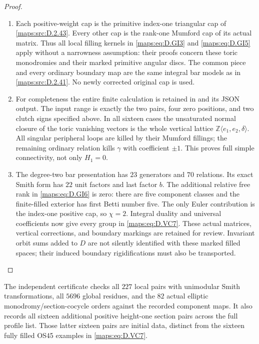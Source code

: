 \begin{proof}
\begin{enumerate}[label=\arabic*.,leftmargin=*]
\item Each positive-weight cap is the primitive index-one triangular cap
of \ref{maps:src:D.2.43}. Every other cap is the rank-one Mumford cap of its actual
matrix. Thus all local filling kernels in \eqref{maps:eq:D.GI3} and \eqref{maps:eq:D.GI5} apply
without a narrowness assumption: their proofs concern these toric
monodromies and their marked primitive angular discs. The common
piece and every ordinary boundary map are the same integral bar
models as in \ref{maps:src:D.2.41}. No newly corrected original cap is used.

\item For completeness the entire finite calculation is retained in
 and its JSON output.
The input range is exactly the two pairs, four zero positions,
and two clutch signs specified above. In all sixteen cases the
unsaturated normal closure of the toric vanishing vectors is the
whole vertical lattice $\mathbb Z\langle e_1,e_2,\delta\rangle$.
All singular peripheral loops are killed by their Mumford fillings;
the remaining ordinary relation kills $\gamma$ with coefficient
$\pm1$. This proves full simple connectivity, not only $H_1=0$.

\item The degree-two bar presentation has $23$ generators and $70$
relations. Its exact Smith form has $22$ unit factors and last
factor $b$. The additional relative free rank in \eqref{maps:eq:D.GI6} is zero:
there are five component classes and the finite-filled exterior
has first Betti number five. The only Euler contribution is the
index-one positive cap, so $\chi=2$. Integral duality and universal
coefficients now give every group in \eqref{maps:eq:D.VC7}.
These actual matrices, vertical corrections, and boundary markings
are retained for review. Invariant orbit sums added to $D$ are not
silently identified with these marked filled spaces; their induced
boundary rigidifications must also be transported.
\end{enumerate}
\end{proof}

The independent certificate
checks all $227$ local pairs with unimodular Smith transformations,
all $5696$ global residues, and the $82$ actual elliptic
monodromy/section-cocycle orders against the recorded component
maps. It also records all sixteen additional positive height-one
section pairs across the full profile list. Those latter sixteen
pairs are initial data, distinct from the sixteen fully filled
OS45 examples in \eqref{maps:eq:D.VC7}.


